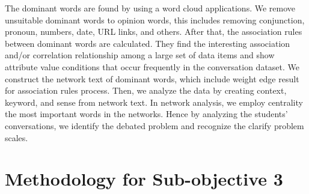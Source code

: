\documentclass[letterpaper%
, twoside%
, 12pt%
,these%
, english%
,creativecommons,hyperref, withAlgo2e %
]{thETS}
\begin{document}
The dominant words are found by using a word cloud applications. We remove unsuitable dominant words to opinion words, this includes removing conjunction, pronoun, numbers, date,  URL links, and others. After that, the association rules between dominant words are calculated.  They find the interesting association and/or correlation relationship among a large set of data items and show attribute value conditions that occur frequently in the conversation dataset. We construct the network text of dominant words, which include weight edge result for association rules process. Then, we analyze the data by creating context, keyword, and sense from network text. In network analysis, we employ centrality the most important words in the networks. Hence by analyzing the students' conversations,  we identify the debated problem and recognize the clarify problem scales. 




\section{Methodology for Sub-objective 3}
\end{document}
